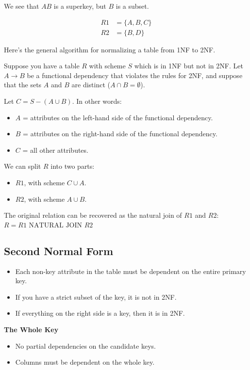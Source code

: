 \documentclass{article}
\begin{document}
We see that $AB$ is a superkey, but $B$ is a subset.

\begin{align*}
    R1 & = \{A, B, C\} \\
    R2 & = \{B, D\}
\end{align*}

Here's the general algorithm for normalizing a table from 1NF to 2NF.

Suppose you have a table $R$ with scheme $S$ which is in 1NF but not in 2NF.
Let $A \rightarrow B$ be a functional dependency that violates the rules for
2NF, and suppose that the sets $A$ and $B$ are distinct ($A \cap B =
    \emptyset$).

Let $C = S - (A \cup B)$. In other words:
\begin{itemize}
    \item $A$ = attributes on the left-hand side of the functional dependency.
    \item $B$ = attributes on the right-hand side of the functional dependency.
    \item $C$ = all other attributes.
\end{itemize}

We can split $R$ into two parts:
\begin{itemize}
    \item $R1$, with scheme $C \cup A$.
    \item $R2$, with scheme $A \cup B$.
\end{itemize}

The original relation can be recovered as the natural join of $R1$ and $R2$: $R
    = R1 \text{ NATURAL JOIN } R2$

\subsection{Second Normal Form}
\begin{itemize}
    \item Each non-key attribute in the table must be dependent on the entire primary
          key.
    \item If you have a strict subset of the key, it is not in 2NF.
    \item If everything on the right side is a key, then it is in 2NF.
\end{itemize}

\textbf{The Whole Key}
\begin{itemize}
    \item No partial dependencies on the candidate keys.
    \item Columns must be dependent on the whole key.
\end{itemize}
\end{document}
